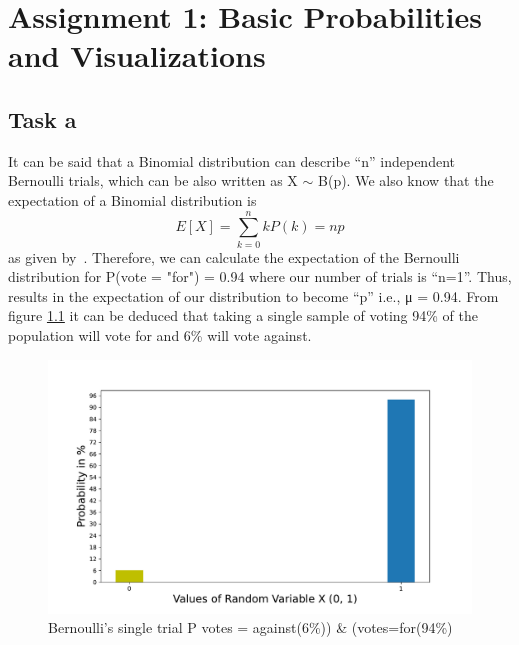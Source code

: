 \chapter{Assignment 1: Basic Probabilities and Visualizations}

\section{Task a}

It can be said that a Binomial distribution can describe “n” independent Bernoulli trials, which can be also written as X ${\sim}$  B(p). We also know that the expectation of a Binomial distribution is \begin{equation}  E [X] = \sum_{k=0}^{n}kP(k)= np \label{task1_a} \end{equation} as given by~\cite{Iubh:2021}. \newline
Therefore, we can calculate the expectation of the Bernoulli distribution for P(vote = "for") = 0.94 where our number of trials is “n=1”. Thus, results in the expectation of our distribution to become “p” i.e., μ = 0.94. From figure \ref{fig:task_1_a} it can be deduced that taking a single sample of voting 94\% of the population will vote for and 6\% will vote against.

\begin{figure}[h!]
\centering
\includegraphics[width=\textwidth]{pics/task_1_a.pdf}
\caption{Bernoulli’s single trial P votes = against(6\%)) \& (votes=for(94\%)}\label{fig:task_1_a}
\end{figure}
\FloatBarrier 

